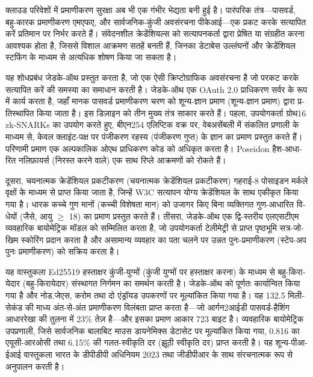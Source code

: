 \documentclass[12pt,a4paper,oneside]{report}
\begin{document}
\begin{hindi}
क्लाउड परिवेशों में प्रमाणीकरण सुरक्षा अब भी एक गंभीर भेद्यता बनी हुई है। पारंपरिक तंत्र—पासवर्ड, बहु-कारक प्रमाणीकरण एमएफए, और सार्वजनिक-कुंजी अवसंरचना पीकेआई—एक प्रकट करके सत्यापित करें प्रतिमान पर निर्भर करते हैं। संवेदनशील क्रेडेंशियल्स को सत्यापनकर्ता द्वारा प्रेषित या संग्रहीत करना आवश्यक होता है, जिससे विशाल आक्रमण सतहें बनती हैं, जिनका डेटाबेस उल्लंघनों और क्रेडेंशियल स्टफिंग के माध्यम से अत्यधिक शोषण किया जा सकता है।

यह शोधप्रबंध जेडके-ऑथ प्रस्तुत करता है, जो एक ऐसी क्रिप्टोग्राफिक अवसंरचना है जो परकट करके सत्यापित करें की समस्या का समाधान करती है। जेडके-ऑथ एक \textenglish{OAuth 2.0} प्राधिकरण सर्वर के रूप में कार्य करता है, जहाँ मानक पासवर्ड प्रमाणीकरण चरण को शून्य-ज्ञान प्रमाण (शून्य-ज्ञान प्रमाण) द्वारा प्रतिस्थापित किया जाता है। इस डिज़ाइन को तीन मुख्य तंत्र साकार करते हैं। पहला, उपयोगकर्ता ग्रोथ16 \textenglish{zk-SNARKs} का उपयोग करते हुए, बीएन254 एलिप्टिक वक्र पर, वेबअसेंबली में संकलित प्रणाली के माध्यम से, केवल क्लाइंट-पक्ष पर पंजीकरण रहस्य (पंजीकरण गुप्त) के ज्ञान का प्रमाण प्रस्तुत करते हैं। परिणामी प्रमाण एक अल्पकालिक ओएथ प्राधिकरण कोड को अधिकृत करता है। \textenglish{Poseidon} हैश-आधारित नलिफ़ायर्स (निरस्त करने वाले) एक साथ रिप्ले आक्रमणों को रोकते हैं।

दूसरा, चयनात्मक क्रेडेंशियल प्रकटीकरण (चयनात्मक क्रेडेंशियल प्रकटीकरण) गहराई-8 पोसाइडन मर्कले वृक्षों के माध्यम से प्राप्त किया जाता है, जिन्हें \textenglish{W3C} सत्यापन योग्य क्रेडेंशियल के साथ एकीकृत किया गया है। धारक कच्चे गुण मानों (कच्ची विशेषता मान) को उजागर किए बिना व्यक्तिगत गुण-आधारित विधेयों (जैसे, आयु $\geq$ 18) का प्रमाण प्रस्तुत करते हैं। तीसरा, जेडके-ऑथ एक द्वि-स्तरीय एलएसटीएम व्यवहारिक बायोमेट्रिक मॉडल को सम्मिलित करता है, जो उपयोगकर्ता टेलीमेट्री से प्राप्त पृष्ठभूमि सत्र-जोखिम स्कोरिंग प्रदान करता है और असामान्य व्यवहार का पता चलने पर उन्नत पुनः-प्रमाणीकरण (स्टेप-अप पुनः प्रमाणीकरण) को सक्रिय करता है।

यह वास्तुकला \textenglish{Ed25519} हस्ताक्षर कुंजी-युग्मों (कुंजी युग्मों पर हस्ताक्षर करना) के माध्यम से बहु-किरायेदार (बहु-किरायेदार) संस्थागत निर्गमन का समर्थन करती है। जेडके-ऑथ को पूर्णतः कार्यान्वित किया गया है और नोड.जेएस, करोम तथा दो एंड्रॉयड उपकरणों पर मूल्यांकित किया गया है। यह 132.5 मिलीसेकंड की माध्य अंत-से-अंत प्रमाणीकरण विलंबता प्राप्त करता है—जो आर्गन2आईडी पासवर्ड-हैशिंग आधाररेखा की तुलना में 23\% तेज़ है—और इसका प्रमाण आकार 723 बाइट है। व्यवहारिक बायोमेट्रिक उपप्रणाली, जिसे सार्वजनिक बालाबिट माउस डायनेमिक्स डेटासेट पर मूल्यांकित किया गया, 0.816 का एयूसी-आरओसी तथा 6.15\% की गलत-स्वीकृति दर (झूठी स्वीकृति दर) प्राप्त करती है। यह शून्य-पीआईआई वास्तुकला भारत के डीपीडीपी अधिनियम 2023 तथा जीडीपीआर के साथ संरचनात्मक रूप से अनुपालन करती है।
\end{hindi}
\end{document}
